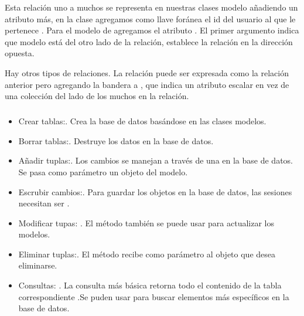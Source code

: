 Esta relación uno a muchos se representa en nuestras clases modelo añadiendo
un atributo más, en la clase  agregamos como
llave foránea el id del usuario al que le
pertenece .
Para el modelo de  agregamos el atributo
. El primer argumento
indica que modelo está del otro lado de la relación,  establece la
relación en la dirección opuesta.

Hay otros tipos de relaciones. La relación   puede ser expresada
como la relación anterior pero agregando la bandera  a
, que indica  un atributo escalar en vez de una colección
del lado de los muchos en la relación.


\subparagraph{}
\label{\detokenize{chapter_two/desc_cloudnao:operaciones-sobre-la-base-de-datos}}

\begin{itemize}
\item
Crear tablas:.
Crea la base de datos basándose en las clases modelos.
\item
Borrar tablas:.
Destruye los datos en la base de datos.
\item
Añadir tuplas:.
Los cambios  se manejan a través de una  en la base de datos. Se pasa como parámetro un objeto del modelo.
\item
Escrubir cambios:.
Para guardar los objetos en la base de datos, las sesiones necesitan ser .
\item
Modificar tupas: .
El método  también se puede usar para actualizar los modelos.
\item
Eliminar tuplas:.
El método  recibe como parámetro al objeto que desea eliminarse.
\item
Consultas: .
La consulta más básica retorna todo el contenido de la tabla correspondiente .Se puden usar  para buscar elementos más específicos en la base de datos.
\end{itemize}

